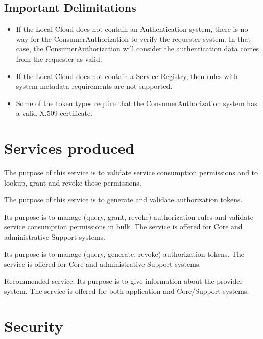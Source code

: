 \documentclass[a4paper]{arrowhead}
\begin{document}
\subsection{Important Delimitations}
\label{sec:delimitations}

\begin{itemize}
    \item  If the Local Cloud does not contain an Authentication system, there is no way for the ConsumerAuthorization to verify the requester system. In that case, the ConsumerAuthorization will consider the authentication data comes from the requester as valid.
    \item If the Local Cloud does not contain a Service Registry, then rules with system metadata requirements are not supported.
    \item Some of the token types require that the ConsumerAuthorization system has a valid X.509 certificate.
\end{itemize}

\newpage

\section{Services produced}
\label{sec:services}

The purpose of this service is to validate service consumption permissions and to lookup, grant and revoke those permissions.

The purpose of this service is to generate and validate authorization tokens.

Its purpose is to manage (query, grant, revoke) authorization rules and validate service consumption permissions in bulk. The service is offered for Core and administrative Support systems.  


Its purpose is to manage (query, generate, revoke) authorization tokens. The service is offered for Core and administrative Support systems.  

Recommended service. Its purpose is to give information about the provider system. The service is offered for both application and Core/Support systems.

\newpage

\section{Security}
\label{sec:security}
\end{document}
